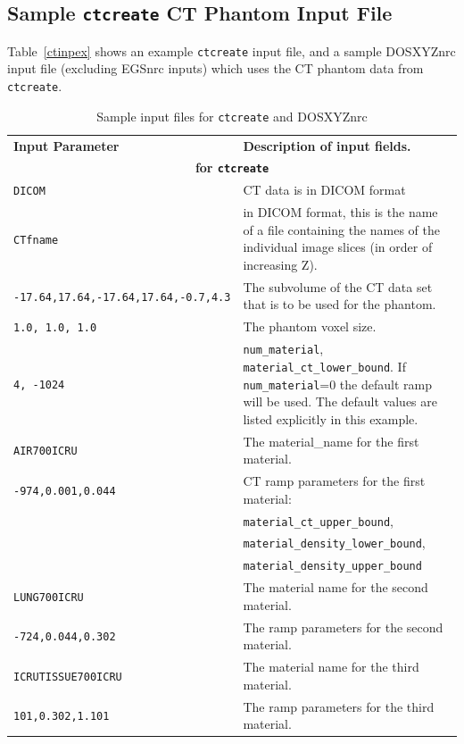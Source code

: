 \documentclass[12pt,twoside]{article}      %
\newcommand{\indexm}[1]{\index{#1}}
\begin{document}
\subsection{Sample {\tt ctcreate} CT Phantom Input File}
\indexm{ctcreate!sample input}
Table~\ref{ctinpex} shows an example {\tt ctcreate} input file, and
a sample DOSXYZnrc input file (excluding EGSnrc inputs)
which uses the CT phantom data from {\tt ctcreate}.

\vspace*{-0.5cm}
\begin{table}[htbp]
\caption{Sample input files for {\tt ctcreate} and DOSXYZnrc}
\begin{tabular}{|p{7cm}p{8.7cm}|}
\hline
\bf{Input Parameter} & \bf{Description of input fields.} \\
\multicolumn{2}{|c|}{\bf for {\tt ctcreate}      } \\
{\tt DICOM} & CT data is in DICOM format \\
{\tt CTfname} & in DICOM format, this is the name of a file containing the names of the individual image slices (in order
of increasing Z).
\\
{\tt -17.64,17.64,-17.64,17.64,-0.7,4.3}
&
The subvolume of the CT data set
that is to be used for the phantom.
\\
{\tt 1.0, 1.0, 1.0 }
&
The phantom voxel size.
\\
{\tt 4, -1024}
&
{\tt num\_material}, {\tt material\_ct\_lower\_bound}.
If {\tt num\_material}=0
the default ramp will be used.
The default values are
listed explicitly in this example.
\\
{\tt AIR700ICRU }
&
The material\_name for the first material.
\\
{\tt -974,0.001,0.044}
&
CT ramp parameters for the first material:\\
&{\tt  material\_ct\_upper\_bound}, \\
&{\tt material\_density\_lower\_bound},\\
&{\tt material\_density\_upper\_bound}
\\
{\tt LUNG700ICRU }
&
The material name for the second material.
\\
{\tt -724,0.044,0.302}
&
The ramp parameters for the second material. \\
{\tt ICRUTISSUE700ICRU} & The material name for the third material.
\\
{\tt 101,0.302,1.101} & The ramp parameters for the third material.

\end{tabular}
\end{table}
\end{document}
